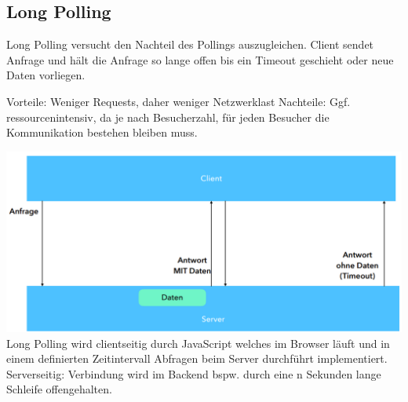 \documentclass[12pt,a4paper]{article}
\begin{document}
\subsection{Long Polling}
Long Polling versucht den Nachteil des Pollings auszugleichen. Client sendet Anfrage und hält die Anfrage so lange offen bis ein Timeout geschieht oder neue Daten vorliegen. \\
\begin{outline}
	\1 Vorteile:
		\2 Weniger Requests, daher weniger Netzwerklast
	\1 Nachteile:
		\2 Ggf. ressourcenintensiv, da je nach Besucherzahl, für jeden Besucher die Kommunikation bestehen bleiben muss.
\end{outline}
\includegraphics[width=\textwidth]{Bilder/long_polling.PNG}
Long Polling wird clientseitig durch JavaScript welches im Browser läuft und in einem definierten Zeitintervall Abfragen beim Server durchführt implementiert. Serverseitig: Verbindung wird im Backend bspw. durch eine n Sekunden lange Schleife offengehalten.
\end{document}
